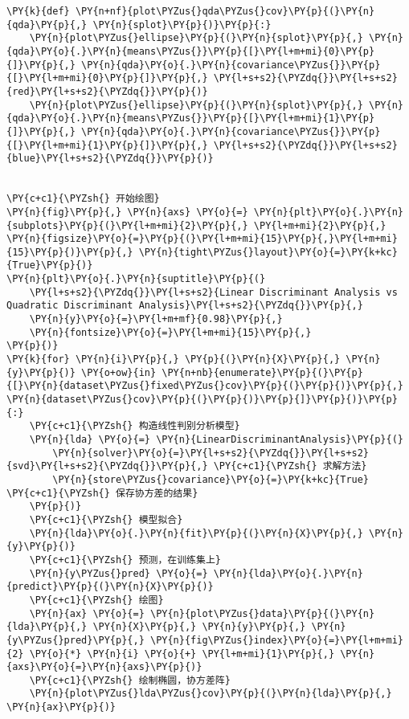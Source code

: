 \begin{Verbatim}[commandchars=\\\{\}]
\PY{k}{def} \PY{n+nf}{plot\PYZus{}qda\PYZus{}cov}\PY{p}{(}\PY{n}{qda}\PY{p}{,} \PY{n}{splot}\PY{p}{)}\PY{p}{:}
    \PY{n}{plot\PYZus{}ellipse}\PY{p}{(}\PY{n}{splot}\PY{p}{,} \PY{n}{qda}\PY{o}{.}\PY{n}{means\PYZus{}}\PY{p}{[}\PY{l+m+mi}{0}\PY{p}{]}\PY{p}{,} \PY{n}{qda}\PY{o}{.}\PY{n}{covariance\PYZus{}}\PY{p}{[}\PY{l+m+mi}{0}\PY{p}{]}\PY{p}{,} \PY{l+s+s2}{\PYZdq{}}\PY{l+s+s2}{red}\PY{l+s+s2}{\PYZdq{}}\PY{p}{)}
    \PY{n}{plot\PYZus{}ellipse}\PY{p}{(}\PY{n}{splot}\PY{p}{,} \PY{n}{qda}\PY{o}{.}\PY{n}{means\PYZus{}}\PY{p}{[}\PY{l+m+mi}{1}\PY{p}{]}\PY{p}{,} \PY{n}{qda}\PY{o}{.}\PY{n}{covariance\PYZus{}}\PY{p}{[}\PY{l+m+mi}{1}\PY{p}{]}\PY{p}{,} \PY{l+s+s2}{\PYZdq{}}\PY{l+s+s2}{blue}\PY{l+s+s2}{\PYZdq{}}\PY{p}{)}


\PY{c+c1}{\PYZsh{} 开始绘图}
\PY{n}{fig}\PY{p}{,} \PY{n}{axs} \PY{o}{=} \PY{n}{plt}\PY{o}{.}\PY{n}{subplots}\PY{p}{(}\PY{l+m+mi}{2}\PY{p}{,} \PY{l+m+mi}{2}\PY{p}{,} \PY{n}{figsize}\PY{o}{=}\PY{p}{(}\PY{l+m+mi}{15}\PY{p}{,}\PY{l+m+mi}{15}\PY{p}{)}\PY{p}{,} \PY{n}{tight\PYZus{}layout}\PY{o}{=}\PY{k+kc}{True}\PY{p}{)}
\PY{n}{plt}\PY{o}{.}\PY{n}{suptitle}\PY{p}{(}
    \PY{l+s+s2}{\PYZdq{}}\PY{l+s+s2}{Linear Discriminant Analysis vs Quadratic Discriminant Analysis}\PY{l+s+s2}{\PYZdq{}}\PY{p}{,}
    \PY{n}{y}\PY{o}{=}\PY{l+m+mf}{0.98}\PY{p}{,}
    \PY{n}{fontsize}\PY{o}{=}\PY{l+m+mi}{15}\PY{p}{,}
\PY{p}{)}
\PY{k}{for} \PY{n}{i}\PY{p}{,} \PY{p}{(}\PY{n}{X}\PY{p}{,} \PY{n}{y}\PY{p}{)} \PY{o+ow}{in} \PY{n+nb}{enumerate}\PY{p}{(}\PY{p}{[}\PY{n}{dataset\PYZus{}fixed\PYZus{}cov}\PY{p}{(}\PY{p}{)}\PY{p}{,} \PY{n}{dataset\PYZus{}cov}\PY{p}{(}\PY{p}{)}\PY{p}{]}\PY{p}{)}\PY{p}{:}
    \PY{c+c1}{\PYZsh{} 构造线性判别分析模型}
    \PY{n}{lda} \PY{o}{=} \PY{n}{LinearDiscriminantAnalysis}\PY{p}{(}
        \PY{n}{solver}\PY{o}{=}\PY{l+s+s2}{\PYZdq{}}\PY{l+s+s2}{svd}\PY{l+s+s2}{\PYZdq{}}\PY{p}{,} \PY{c+c1}{\PYZsh{} 求解方法}
        \PY{n}{store\PYZus{}covariance}\PY{o}{=}\PY{k+kc}{True} \PY{c+c1}{\PYZsh{} 保存协方差的结果}
    \PY{p}{)}
    \PY{c+c1}{\PYZsh{} 模型拟合}
    \PY{n}{lda}\PY{o}{.}\PY{n}{fit}\PY{p}{(}\PY{n}{X}\PY{p}{,} \PY{n}{y}\PY{p}{)}
    \PY{c+c1}{\PYZsh{} 预测，在训练集上}
    \PY{n}{y\PYZus{}pred} \PY{o}{=} \PY{n}{lda}\PY{o}{.}\PY{n}{predict}\PY{p}{(}\PY{n}{X}\PY{p}{)}
    \PY{c+c1}{\PYZsh{} 绘图}
    \PY{n}{ax} \PY{o}{=} \PY{n}{plot\PYZus{}data}\PY{p}{(}\PY{n}{lda}\PY{p}{,} \PY{n}{X}\PY{p}{,} \PY{n}{y}\PY{p}{,} \PY{n}{y\PYZus{}pred}\PY{p}{,} \PY{n}{fig\PYZus{}index}\PY{o}{=}\PY{l+m+mi}{2} \PY{o}{*} \PY{n}{i} \PY{o}{+} \PY{l+m+mi}{1}\PY{p}{,} \PY{n}{axs}\PY{o}{=}\PY{n}{axs}\PY{p}{)}
    \PY{c+c1}{\PYZsh{} 绘制椭圆，协方差阵}
    \PY{n}{plot\PYZus{}lda\PYZus{}cov}\PY{p}{(}\PY{n}{lda}\PY{p}{,} \PY{n}{ax}\PY{p}{)}


\end{Verbatim}
